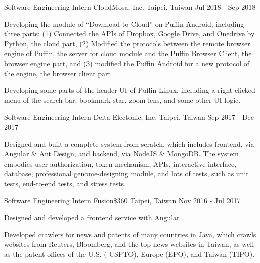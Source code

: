 \begin{cventries}
  \cventry
    {Software Engineering Intern} %
    {CloudMosa, Inc.} %
    {Taipei, Taiwan} %
    {Jul 2018 - Sep 2018} %
    {
      \begin{cvitems} %
        \item {Developing the module of ``Download to Cloud'' on Puffin Android, including three parts:
          (1) Connected the APIs of Dropbox, Google Drive, and Onedrive by Python, the cloud part},
          (2) Modified the protocols between the remote browser engine of Puffin, the server for cloud module and the Puffin Browser Client, the browser engine part, and
          (3) modified the Puffin Android for a new protocol of the engine, the browser client part
        \item {Developing some parts of the header UI of Puffin Linux, including a right-clicked menu of the search bar, bookmark star, zoom lens, and some other UI logic.}
      \end{cvitems}
    }

  \cventry
    {Software Engineering Intern} %
    {Delta Electonic, Inc.} %
    {Taipei, Taiwan} %
    {Sep 2017 - Dec 2017} %
    {
      \begin{cvitems} %
        \item {Designed and built a complete system from scratch, which includes frontend, via Angular \& Ant Design, and backend, via NodeJS \& MongoDB. The system embodies user authorization, token mechanism, APIs, interactive interface, database, professional genome-designing module, and lots of tests, such as unit tests, end-to-end tests, and stress tests.}
      \end{cvitems}
    }

  \cventry
    {Software Engineering Intern} %
    {Fusion\$360} %
    {Taipei, Taiwan} %
    {Nov 2016 - Jul 2017} %
    {
      \begin{cvitems} %
        \item {Designed and developed a frontend service with Angular}
        \item {Developed crawlers for news and patents of many countries in Java, which crawls websites from Reuters, Bloomberg, and the top news websites in Taiwan, as well as the patent offices of the U.S. ( USPTO), Europe (EPO), and Taiwan (TIPO).}
      \end{cvitems}
    }

\end{cventries}

